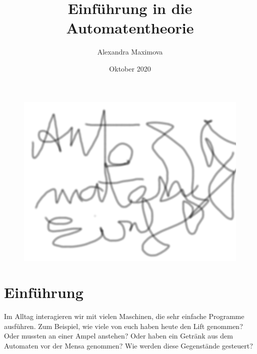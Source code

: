 \documentclass{article}
\title{Einführung in die Automatentheorie}
\author{Alexandra Maximova}
\date{Oktober 2020}
\begin{document}
\maketitle

\begin{figure}[H]
\centering
\includegraphics[width=\linewidth]{Pictures/image.png} 
\end{figure}


\section{Einführung}
Im Alltag interagieren wir mit vielen Maschinen, die sehr einfache Programme ausführen. Zum Beispiel, wie viele von euch haben heute den Lift genommen? Oder mussten an einer Ampel anstehen? Oder haben ein Getränk aus dem Automaten vor der Mensa genommen? Wie werden diese Gegenstände gesteuert?
\end{document}
